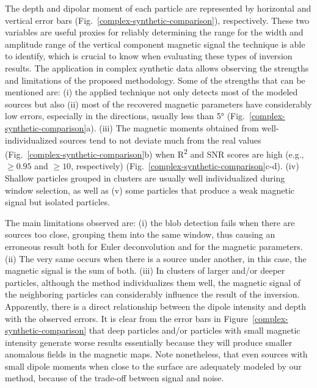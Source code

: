 The depth and dipolar moment of each particle are represented by horizontal and vertical error bars (Fig.~\ref{complex-synthetic-comparison}), respectively. These two variables are useful proxies for reliably determining the range for the width and amplitude range of the vertical component magnetic signal the technique is able to identify, which is crucial to know when evaluating these types of inversion results.
The application in complex synthetic data allows observing the strengths and limitations of the proposed methodology. Some of the strengths that can be mentioned are: (i) the applied technique not only detects most of the modeled sources but also (ii) most of the recovered magnetic parameters have considerably low errors, especially in the directions, usually less than 5° (Fig.~\ref{complex-synthetic-comparison}a). (iii) The magnetic moments obtained from well-individualized sources tend to not deviate much from the real values (Fig.~\ref{complex-synthetic-comparison}b) when R\textsuperscript{2} and SNR scores are high (e.g., $\geq 0.95$ and $\geq 10$, respectively) (Fig.~\ref{complex-synthetic-comparison}c-d). (iv) Shallow particles grouped in clusters are usually well individualized during window selection, as well as (v) some particles that produce a weak magnetic signal but isolated particles.

The main limitations observed are: (i) the blob detection fails when there are sources too close, grouping them into the same window, thus causing an erroneous result both for Euler deconvolution and for the magnetic parameters. (ii) The very same occurs when there is a source under another, in this case, the magnetic signal is the sum of both. (iii) In clusters of larger and/or deeper particles, although the method individualizes them well, the magnetic signal of the neighboring particles can considerably influence the result of the inversion. Apparently, there is a direct relationship between the dipole intensity and depth with the observed errors. It is clear from the error bars in Figure~\ref{complex-synthetic-comparison} that deep particles and/or particles with small magnetic intensity generate worse results essentially because they will produce smaller anomalous fields in the magnetic maps. Note nonetheless, that even sources with small dipole moments when close to the surface are adequately modeled by our method, because of the trade-off between signal and noise.




